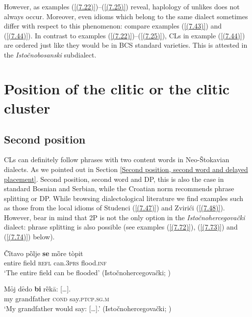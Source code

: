 \noindent However, as examples (\ref{(7.22)})--(\ref{(7.25)}) reveal, haplology of unlikes does not always occur. Moreover, even idioms which belong to the same dialect sometimes differ with respect to this phenomenon: compare examples (\ref{(7.43)}) and (\ref{(7.44)}). In contrast to examples (\ref{(7.22)})--(\ref{(7.25)}), CLs in example (\ref{(7.44)}) are ordered just like they would be in BCS standard varieties. This is attested in the \textit{Istočnobosanski} subdialect.


\section{Position of the clitic or the clitic cluster}
\label{Position of the clitic or clitic cluster:8}
\subsection{Second position}
\label{Second position:8}
CLs can definitely follow phrases with two content words in Neo-Štokavian dialects. As we pointed out in Section \ref{Second position, second word and delayed placement}. Second position, second word and DP, this is also the case in standard Bosnian and Serbian, while the Croatian norm recommends phrase splitting or DP. While browsing dialectological literature we find examples such as those from the local idioms of Studenci (\ref{(7.47)}) and Zvirići (\ref{(7.48)}). However, bear in mind that 2P is not the only option in the \textit{Istočnohercegovački} dialect: phrase splitting is also possible (see examples (\ref{(7.72)}), (\ref{(7.73)}) and (\ref{(7.74)}) below). 

\begin{exe}\ex\label{(7.47)}
\gll Čȉtavo  pȍlje  \textbf{se}  mȍre  tòpit  \\
entire field \textsc{refl}  can.3\textsc{prs}  flood.\textsc{inf}  \\
\glt ‘The entire field can be flooded’
\hfill  (Istočnohercegovački; \citealt[341]{Peco07b})

\ex\label{(7.48)}
\gll Mȏj  dȇdo  \textbf{bi}  {rȅkā: [\dots].} \\
my grandfather \textsc{cond} say.\textsc{ptcp.sg.m} \\
\glt ‘My grandfather would say: [\dots].’ 
\hfill  (Istočnohercegovački; \citealt[342]{Peco07b})
\end{exe}

